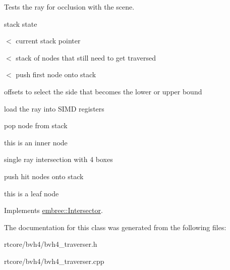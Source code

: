 Tests the ray for occlusion with the scene. 



stack state

$<$ current stack pointer

$<$ stack of nodes that still need to get traversed

$<$ push first node onto stack

offsets to select the side that becomes the lower or upper bound

load the ray into SIMD registers

pop node from stack

this is an inner node

single ray intersection with 4 boxes

push hit nodes onto stack

this is a leaf node 



Implements \hyperlink{classembree_1_1_intersector_a47cf036c3eab7060590c72e7bb51255c}{embree::Intersector}.



The documentation for this class was generated from the following files:\begin{DoxyCompactItemize}
\item 
rtcore/bvh4/bvh4\_\-traverser.h\item 
rtcore/bvh4/bvh4\_\-traverser.cpp\end{DoxyCompactItemize}
